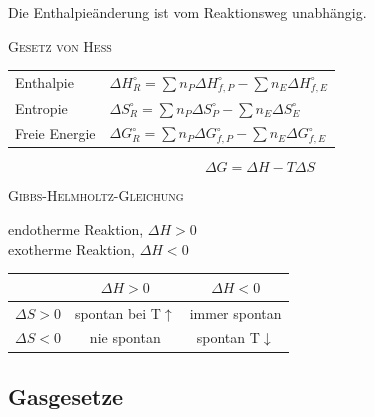 \documentclass[12pt,a4paper]{article}
\renewcommand{\=}[1]{\stackrel{#1}{=}}
\theoremstyle{definition}
\theoremstyle{remark}
\begin{document}
\begin{center}
\begin{minipage}[t]{.5\linewidth}
\vspace{0pt}

\begin{framed}
\centering Die Enthalpieänderung ist vom Reaktionsweg unabhängig.
\begin{center}
\textsc{Gesetz von Hess}
\end{center}
\end{framed}

\begin{tabular}{ll}
Enthalpie & $\Delta H^{\circ}_{R} = \sum n_{P} \Delta H^{\circ}_{f, P} - \sum n_{E} \Delta H^{\circ}_{f, E}$\\
Entropie & $\Delta S^{\circ}_{R} = \sum n_{P} \Delta S^{\circ}_{P} - \sum n_{E} \Delta S^{\circ}_{E}$\\
Freie Energie & $\Delta G^{\circ}_{R} = \sum n_{P} \Delta G^{\circ}_{f, P} - \sum n_{E} \Delta G^{\circ}_{f, E}$
\end{tabular}

\end{minipage}%
\hspace{0.02\linewidth}
\begin{minipage}[t]{.4\linewidth}
\vspace{0pt}

\begin{framed}
$$\Delta G = \Delta H - T \Delta S$$
\begin{center}
\textsc{Gibbs-Helmholtz-Gleichung}
\end{center}
\end{framed}

endotherme Reaktion, $\Delta H > 0$\\
exotherme Reaktion, $\Delta H < 0$\\

\begin{tabular}{l|cc}
 & $\Delta H > 0$ & $\Delta H < 0$\\
\hline
$\Delta S > 0$ & spontan bei T$\uparrow$ & immer spontan\\
$\Delta S < 0$ & nie spontan & spontan T$\downarrow$
\end{tabular}

\end{minipage}
\end{center}


\subsection{Gasgesetze}
\end{document}
